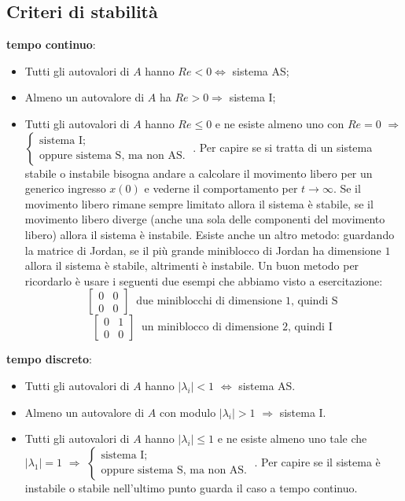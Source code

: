     \subsection{Criteri di stabilità}
    \textbf{tempo continuo}:
    \begin{itemize}
        \item Tutti gli autovalori di $A$ hanno $Re < 0 \Longleftrightarrow $ sistema AS;
        \item Almeno un autovalore di $A$ ha $Re > 0 \Longrightarrow$ sistema I;
        \item Tutti gli autovalori di $A$ hanno $Re \leq 0$ e ne esiste almeno uno con $Re = 0$ $\Longrightarrow$ $\begin{cases}
            \text{sistema I;}\;\\
            \text{oppure sistema S, ma non AS.}\;
        \end{cases}$. \newline
        Per capire se si tratta di un sistema stabile o instabile bisogna andare a calcolare il movimento libero per un generico ingresso $x(0)$ e vederne il comportamento per $t \rightarrow \infty$. Se il movimento libero rimane sempre limitato allora il sistema è stabile, se il movimento libero diverge (anche una sola delle componenti del movimento libero) allora il sistema è instabile. \newline
        Esiste anche un altro metodo: guardando la matrice di Jordan, se il più grande miniblocco di Jordan ha dimensione $1$ allora il sistema è stabile, altrimenti è instabile. Un buon metodo per ricordarlo è usare i seguenti due esempi che abbiamo visto a esercitazione:
        \[
            \left[\begin{matrix}
                0 & 0 \\
                0 & 0
            \end{matrix}\right] \;\;\text{due miniblocchi di dimensione 1, quindi S}\;
        \]
        \[
            \left[\begin{matrix}
                0&1\\
                0&0
            \end{matrix}\right] \;\; \text{un miniblocco di dimensione 2, quindi I}\;
        \]
    \end{itemize}
    \textbf{tempo discreto}:
    \begin{itemize}
        \item Tutti gli autovalori di $A$ hanno $|\lambda_i| < 1$ $\Longleftrightarrow$ sistema AS.
        \item Almeno un autovalore di $A$ con modulo $|\lambda_i| > 1$ $\Longrightarrow$ sistema I.
        \item Tutti gli autovalori di $A$ hanno $|\lambda_i| \leq 1$ e ne esiste almeno uno tale che $|\lambda_1| = 1$ $\Longrightarrow$ $\begin{cases}
            \text{sistema I;}\;\\
            \text{oppure sistema S, ma non AS.}\;
        \end{cases}$. \newline
        Per capire se il sistema è instabile o stabile nell'ultimo punto guarda il caso a tempo continuo.
    \end{itemize}
